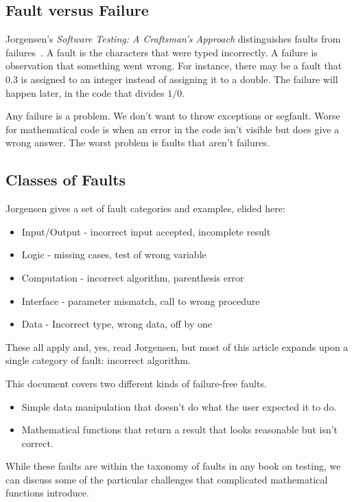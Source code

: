 \documentclass[fleqn,10pt]{olplainarticle}
\begin{document}
\subsection{Fault versus Failure}
Jorgensen's \emph{Software Testing: A Craftsman's Approach} distinguishes
faults from failures~\citep{jorgensen2013}.
A fault is the characters that were typed
incorrectly. A failure is observation that something went wrong.
For instance, there may be a fault that 0.3 is assigned to an integer
instead of assigning it to a double. The failure will happen later,
in the code that divides $1 / 0$.

Any failure is a problem. We don't want to throw exceptions or segfault.
Worse for mathematical code is when an error in the code isn't visible
but does give a wrong answer.
The worst problem is faults that aren't failures.


\subsection{Classes of Faults}
Jorgensen gives a set of fault categories and examples, elided here:
\begin{itemize}
    \item Input/Output - incorrect input accepted, incomplete result
    \item Logic - missing cases, test of wrong variable
    \item Computation - incorrect algorithm, parenthesis error
    \item Interface - parameter mismatch, call to wrong procedure
    \item Data - Incorrect type, wrong data, off by one
\end{itemize}
These all apply and, yes, read Jorgensen, but most of this article 
expands upon a single category of fault: incorrect algorithm.

This document covers two different kinds of failure-free faults.
\begin{itemize}
\item Simple data manipulation that doesn't do what the user
   expected it to do.
   
\item Mathematical functions that return a result that looks
   reasonable but isn't correct.
\end{itemize}
While these faults are within the taxonomy of faults
in any book on testing, we can discuss some of the particular
challenges that complicated mathematical functions introduce.


\end{document}
